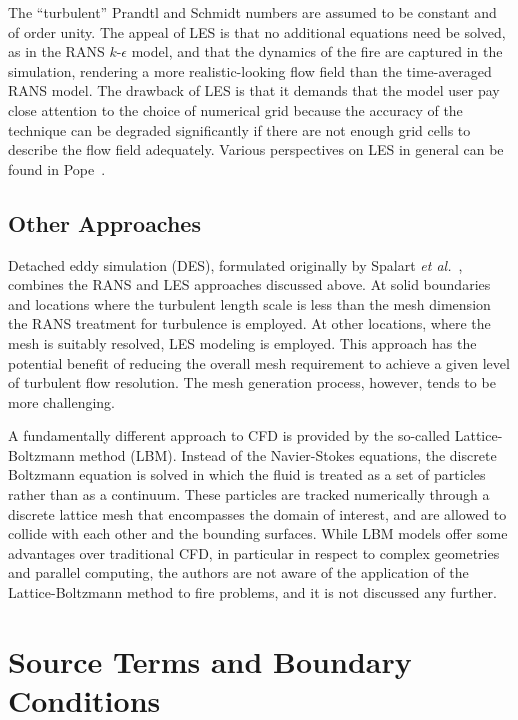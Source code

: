 \documentclass[graybox]{svmult}
\begin{document}
The ``turbulent'' Prandtl and Schmidt numbers are assumed to be constant and of order unity. The appeal of LES is that no additional equations need be solved, as in the RANS $k$-$\epsilon$  model, and that the dynamics of the fire are captured in the simulation, rendering a more realistic-looking flow field than the time-averaged RANS model. The drawback of LES is that it demands that the model user pay close attention to the choice of numerical grid because the accuracy of the technique can be degraded significantly if there are not enough grid cells to describe the flow field adequately. Various perspectives on LES in general can be found in Pope~\cite{Pope}.


\subsection{Other Approaches}

Detached eddy simulation (DES), formulated originally by Spalart {\em et al.}~\cite{Spalart}, combines the RANS and LES approaches discussed above. At solid boundaries and locations where the turbulent length scale is less than the mesh dimension the RANS treatment for turbulence is employed. At other locations, where the mesh is suitably resolved, LES modeling is employed. This approach has the potential benefit of reducing the overall mesh requirement to achieve a given level of turbulent flow resolution. The mesh generation process, however, tends to be more challenging.

A fundamentally different approach to CFD is provided by the so-called Lattice-Boltzmann method (LBM). Instead of the Navier-Stokes equations, the discrete Boltzmann equation is solved in which the fluid is treated as a set of particles rather than as a continuum. These particles are tracked numerically through a discrete lattice mesh that encompasses the domain of interest, and are allowed to collide with each other and the bounding surfaces. While LBM models offer some advantages over traditional CFD, in particular in respect to complex geometries and parallel computing, the authors are not aware of the application of the Lattice-Boltzmann method to fire problems, and it is not discussed any further.



\section{Source Terms and Boundary Conditions}
\end{document}

